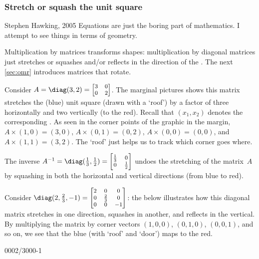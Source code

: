 \subsubsection{Stretch or squash the unit square}

\begin{quoted}{Stephen Hawking, 2005}
Equations are just the boring part of mathematics.  
I attempt to see things in terms of geometry.
\end{quoted}


Multiplication by matrices transforms shapes:
multiplication by diagonal matrices just stretches or squashes and/or reflects in the direction of the .
The next \autoref{sec:omr} introduces matrices that rotate.




\begin{example} \label{eg:}
Consider \(A=\diag(3,2)=\footnotesize\begin{bmatrix} 3&0\\0&2 \end{bmatrix}\). 
%
The marginal pictures shows this matrix stretches the (blue) unit square (drawn with a `roof') by a factor of three horizontally and two vertically (to the red). 
Recall that \((x_1,x_2)\) denotes the corresponding .  
As seen in the corner points of the graphic in the margin,  \(A\times(1,0)=(3,0)\), \(A\times(0,1)=(0,2)\), \(A\times(0,0)=(0,0)\),  and \(A\times(1,1)=(3,2)\).   
The `roof' just helps us to track which corner goes where.

%
The inverse \(A^{-1}=\diag(\frac13,\frac12)=\footnotesize\begin{bmatrix} \frac13&0\\0&\frac12 \end{bmatrix}\) undoes the stretching of the matrix~\(A\) by squashing in both the horizontal and vertical directions (from blue to red).  
\end{example}




\begin{example} \label{eg:}
Consider \(\diag(2,\frac23,-1)=\footnotesize\begin{bmatrix} 2&0&0\\0&\frac23&0\\0&0&-1 \end{bmatrix}\): 
the  below illustrates how this diagonal matrix stretches in one direction, squashes in another, and reflects in the vertical.  
By multiplying the matrix by corner vectors \((1,0,0)\), \((0,1,0)\), \((0,0,1)\), and so on, we see that the blue  (with `roof' and `door') maps to the red.
\begin{center}
\def\unithousesize{small}
000{2/3}000{-1}
\end{center}
\end{example}

